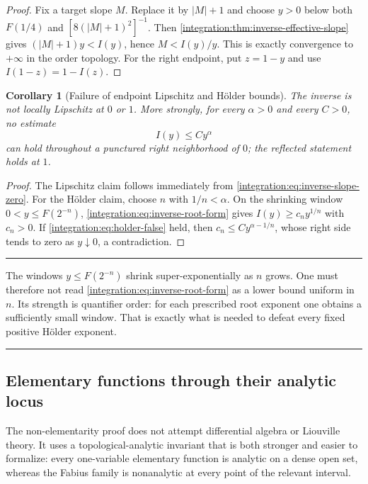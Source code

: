 \documentclass[11pt,oneside]{article}
\newtheorem{corollary}[theorem]{Corollary}
\theoremstyle{definition}
\theoremstyle{remark}
\newenvironment{boxedremark}{%
  \par\smallskip\noindent\begin{center}\begin{minipage}{0.94\textwidth}%
  \color{black}\hrule\vspace{0.6em}\small
}{%
  \vspace{0.6em}\hrule\end{minipage}\end{center}\smallskip
}
\begin{document}
\begin{proof}
Fix a target slope $M$.  Replace it by $|M|+1$ and choose $y>0$ below both
$F(1/4)$ and $[8(|M|+1)^2]^{-1}$.  Then \cref{integration:thm:inverse-effective-slope} gives
$(|M|+1)y<I(y)$, hence $M<I(y)/y$.  This is exactly convergence to $+\infty$ in the
order topology.  For the right endpoint, put $z=1-y$ and use
$I(1-z)=1-I(z)$.
\end{proof}

\begin{corollary}[Failure of endpoint Lipschitz and H\"older bounds]
\label{integration:cor:inverse-not-holder}
The inverse is not locally Lipschitz at $0$ or $1$.  More strongly, for every
$\alpha>0$ and every $C>0$, no estimate
\begin{equation}
 I(y)\le Cy^\alpha
 \label{integration:eq:holder-false}
\end{equation}
can hold throughout a punctured right neighborhood of $0$; the reflected statement holds
at $1$.
\end{corollary}

\begin{proof}
The Lipschitz claim follows immediately from \eqref{integration:eq:inverse-slope-zero}.  For the H\"older
claim, choose $n$ with $1/n<\alpha$.  On the shrinking window
$0<y\le F(2^{-n})$, \eqref{integration:eq:inverse-root-form} gives $I(y)\ge c_ny^{1/n}$ with
$c_n>0$.  If \eqref{integration:eq:holder-false} held, then
$c_n\le Cy^{\alpha-1/n}$, whose right side tends to zero as $y\downarrow0$, a
contradiction.
\end{proof}

\begin{boxedremark}
The windows $y\le F(2^{-n})$ shrink super-exponentially as $n$ grows.  One must therefore
not read \eqref{integration:eq:inverse-root-form} as a lower bound uniform in $n$.  Its strength is
quantifier order: for each prescribed root exponent one obtains a sufficiently small window.
That is exactly what is needed to defeat every fixed positive H\"older exponent.
\end{boxedremark}

\subsection{Elementary functions through their analytic locus}
\label{integration:sec:elementary}

The non-elementarity proof does not attempt differential algebra or Liouville theory.  It
uses a topological-analytic invariant that is both stronger and easier to formalize: every
one-variable elementary function is analytic on a dense open set, whereas the Fabius family
is nonanalytic at every point of the relevant interval.
\end{document}
